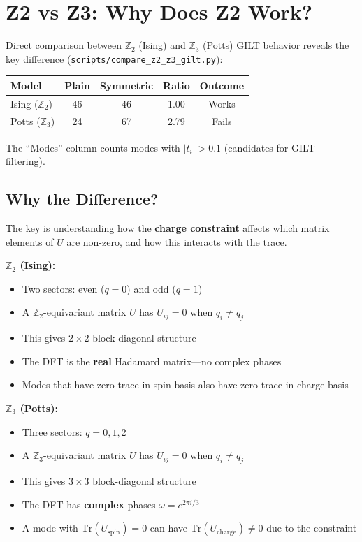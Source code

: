 \documentclass{article}
\begin{document}
\section{Z2 vs Z3: Why Does Z2 Work?}
\label{sec:z2_z3_comparison}

Direct comparison between $\mathbb{Z}_2$ (Ising) and $\mathbb{Z}_3$ (Potts) GILT behavior reveals the key difference (\texttt{scripts/compare\_z2\_z3\_gilt.py}):

\begin{center}
\begin{tabular}{|l|c|c|c|c|}
\hline
\textbf{Model} & \textbf{Plain} & \textbf{Symmetric} & \textbf{Ratio} & \textbf{Outcome} \\
\hline
Ising ($\mathbb{Z}_2$) & 46 & 46 & 1.00 & Works \\
Potts ($\mathbb{Z}_3$) & 24 & 67 & 2.79 & Fails \\
\hline
\end{tabular}
\end{center}

The ``Modes'' column counts modes with $|t_i| > 0.1$ (candidates for GILT filtering).

\subsection{Why the Difference?}

The key is understanding how the \textbf{charge constraint} affects which matrix elements of $U$ are non-zero, and how this interacts with the trace.

\textbf{$\mathbb{Z}_2$ (Ising):}
\begin{itemize}
    \item Two sectors: even ($q=0$) and odd ($q=1$)
    \item A $\mathbb{Z}_2$-equivariant matrix $U$ has $U_{ij} = 0$ when $q_i \neq q_j$
    \item This gives $2 \times 2$ block-diagonal structure
    \item The DFT is the \textbf{real} Hadamard matrix---no complex phases
    \item Modes that have zero trace in spin basis also have zero trace in charge basis
\end{itemize}

\textbf{$\mathbb{Z}_3$ (Potts):}
\begin{itemize}
    \item Three sectors: $q = 0, 1, 2$
    \item A $\mathbb{Z}_3$-equivariant matrix $U$ has $U_{ij} = 0$ when $q_i \neq q_j$
    \item This gives $3 \times 3$ block-diagonal structure
    \item The DFT has \textbf{complex} phases $\omega = e^{2\pi i/3}$
    \item A mode with $\text{Tr}(U_{\text{spin}}) = 0$ can have $\text{Tr}(U_{\text{charge}}) \neq 0$ due to the constraint
\end{itemize}
\end{document}
